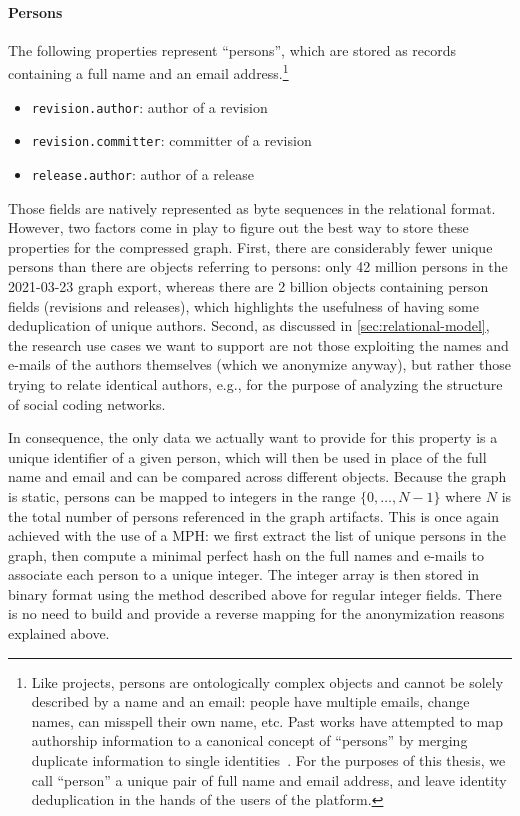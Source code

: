 \paragraph{Persons}

The following properties represent ``persons'', which are stored as records
containing a full name and an email address.\footnote{Like projects, persons
are ontologically complex objects and cannot be solely described by a name and
an email: people have multiple emails, change names, can misspell their own
name, etc. Past works have attempted to map authorship information to a
canonical concept of ``persons'' by merging duplicate information to single
identities~\cite{wiese2016mailing, zhu2019empirical}. For the purposes of this
thesis, we call ``person'' a unique pair of full name and email address, and
leave identity deduplication in the hands of the users of the platform.}

\begin{itemize}
    \setlength\itemsep{0em}
    \item \texttt{revision.author}: author of a revision
    \item \texttt{revision.committer}: committer of a revision
    \item \texttt{release.author}: author of a release
\end{itemize}

Those fields are natively represented as byte sequences in the relational
format.  However, two factors come in play to figure out the best way to store
these properties for the compressed graph. First, there are considerably fewer
unique persons than there are objects referring to persons: only 42 million
persons in the 2021-03-23 graph export, whereas there are 2 billion objects
containing person fields (revisions and releases), which highlights the
usefulness of having some deduplication of unique authors. Second, as discussed
in \cref{sec:relational-model}, the research use cases we want to support are
not those exploiting the names and e-mails of the authors themselves (which we
anonymize anyway), but rather those trying to relate identical authors, e.g.,
for the purpose of analyzing the structure of social coding networks.

In consequence, the only data we actually want to provide for this property is
a unique identifier of a given person, which will then be used in place of the
full name and email and can be compared across different objects.
Because the graph is static, persons can be mapped to integers in the range
$\{0,\ldots,N-1\}$ where $N$ is the total number of persons referenced in the
graph artifacts. This is once again achieved with the use of a \gls{MPH}: we
first extract the list of unique persons in the graph, then compute a minimal
perfect hash on the full names and e-mails to associate each person to a unique
integer. The integer array is then stored in binary format using the method
described above for regular integer fields. There is no need to build and
provide a reverse mapping for the anonymization reasons explained above.

